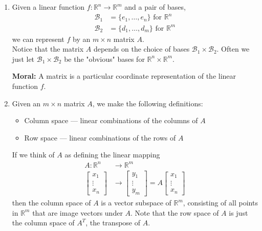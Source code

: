 \begin{enumerate}
\item Given a linear function $f: \mathbb{R}^n \rightarrow \mathbb{R}^m$ and a pair of bases,
    \begin{align*}
        \mathcal{B}_1 &= \{e_1, \dots, e_n\}\text{ for }\mathbb{R}^n \\
        \mathcal{B}_2 &= \{d_1, \dots, d_m\}\text{ for }\mathbb{R}^m
    \end{align*}
    we can represent $f$ by an $m\times n$ matrix $A$. \\

    Notice that the matrix $A$ depends on the choice of bases $\mathcal{B}_1 \times \mathcal{B}_2$.
    Often we just let $\mathcal{B}_1 \times \mathcal{B}_2$ be the "obvious" bases for $\mathbb{R}^n \times \mathbb{R}^m$. 
    
    \textbf{Moral:} A matrix is a particular coordinate representation of the linear function $f$.
    
\item Given an $m \times n$ matrix $A$, we make the following definitions:
    \begin{itemize}
        \item Column space --- linear combinations of the columns of $A$
        \item Row space --- linear combinations of the rows of $A$
    \end{itemize}
    
    If we think of $A$ as defining the linear mapping 
    \begin{align*}
        A: \mathbb{R}^n &\rightarrow \mathbb{R}^m 
        \\
        \begin{bmatrix} x_1 \\ \vdots \\ x_n \end{bmatrix}
            &\rightarrow
            \begin{bmatrix} y_1 \\ \vdots \\ y_m \end{bmatrix}
            =
            A
            \begin{bmatrix} x_1 \\ \vdots \\ x_n \end{bmatrix}
    \end{align*}
    then the column space of $A$ is a vector subspace of $\mathbb{R}^m$, consisting of all points in $\mathbb{R}^m$ that are image vectors under $A$. Note that the row space of $A$ is just the column space of $A^T$, the transpose of $A$. \\
    

\end{enumerate}
